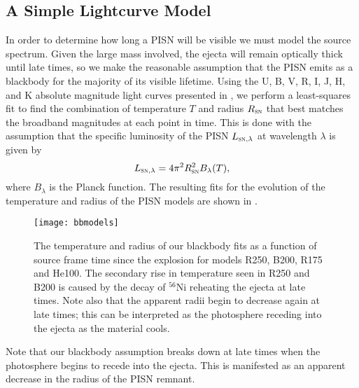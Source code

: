\documentclass[../thesis.tex]{subfiles}
\begin{document}
\subsection{A Simple Lightcurve Model}
In order to determine how long a PISN will be visible we must model
the source spectrum. Given the large mass involved, the ejecta will
remain optically thick until late times, so we make the reasonable
assumption that the PISN emits as a blackbody for the majority of its
visible lifetime.  Using the U, B, V, R, I, J, H, and K absolute
magnitude light curves presented in \citet{KasenWoosleyHeger2011}, we
perform a least-squares fit to find the combination of temperature $T$
and radius $R_{\textsc{sn}}$ that best matches the broadband
magnitudes at each point in time. This is done with the assumption
that the specific luminosity of the PISN $L_{\textsc{sn}, \lambda}$ at
wavelength $\lambda$ is given by
\begin{equation}
L_{\textsc{sn},\lambda} = 4\pi^2 R_{\textsc{sn}}^2 B_{\lambda}(T),
\end{equation}
where $B_{\lambda}$ is the Planck function. The resulting fits for the
evolution of the temperature and radius of the PISN models are shown in
.
\begin{figure}
  \begin{center}
    \texttt{[image: bbmodels]}
    \caption{The temperature and radius of our blackbody
      fits as a function of source frame time since the explosion
      for models R250, B200, R175 and He100.  The secondary rise in
      temperature seen in R250 and B200 is caused by the decay of
      $^{56}$Ni reheating the ejecta at late times.  Note also that the
      apparent radii begin to decrease again at late times; this can
      be interpreted as the photosphere receding into the ejecta as
      the material cools.}
    \label{bbmodels}
  \end{center}
\end{figure}
Note that our blackbody assumption breaks down at late times when the
photosphere begins to recede into the ejecta.  This is manifested as
an apparent decrease in the radius of the PISN remnant.
\end{document}
